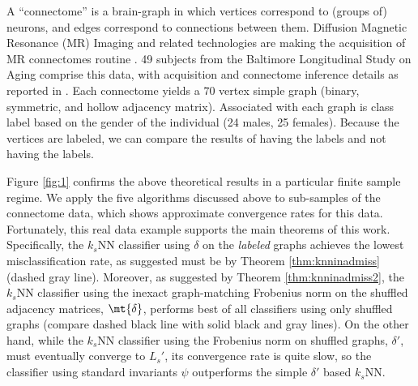\documentclass[10pt,journal,cspaper,compsoc]{IEEEtran}
\begin{document}
A ``connectome'' is a brain-graph in which vertices correspond to (groups of) neurons, and edges correspond to connections between them.  Diffusion Magnetic Resonance (MR) Imaging and related technologies are making the acquisition of MR connectomes routine \cite{Hagmann2010}.  49 subjects from the Baltimore Longitudinal Study on Aging comprise this data, with acquisition and connectome inference details as reported in \cite{Gray11}.  Each connectome yields a $70$ vertex simple graph (binary, symmetric, and hollow adjacency matrix).  Associated with each graph is class label based on the gender of the individual (24 males, 25 females).  Because the vertices are labeled, we can compare the results of having the labels and not having the labels.  

Figure \ref{fig:1} confirms the above theoretical results in a particular finite sample regime.  We apply the five algorithms discussed above to sub-samples of the connectome data, which shows approximate convergence rates for this data.  Fortunately, this real data example supports the main theorems of this work.  Specifically, the $k_s$NN classifier using $\delta$ on the \emph{labeled} graphs achieves the lowest misclassification rate, as suggested must be by Theorem \ref{thm:knninadmiss} (dashed gray line).  Moreover, as suggested by 
Theorem \ref{thm:knninadmiss2},
the $k_s$NN classifier using the inexact graph-matching Frobenius norm on the shuffled adjacency matrices, $\mt{\delta}$, performs best of all classifiers using only shuffled graphs (compare dashed black line with solid black and gray lines).  On the other hand, while the $k_s$NN classifier using the Frobenius norm on shuffled graphs, $\delta'$, must eventually converge to $L_s'$, its convergence rate is quite slow, so the classifier using standard invariants $\psi$ outperforms the simple $\delta'$ based $k_s$NN.


% 
\end{document}
